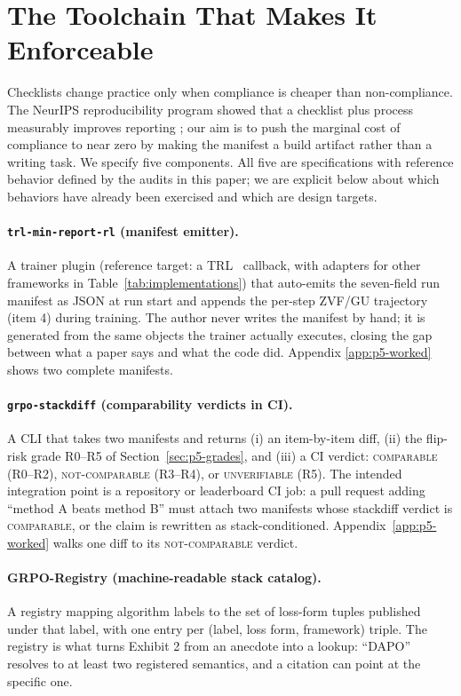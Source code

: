\documentclass{article}  \usepackage[preprint,nonatbib]{neurips_2026} \usepackage[numbers]{natbib}
\providecommand{\tableref}[1]{Table~\ref{#1}}
\providecommand{\secref}[1]{Section~\ref{#1}}
\begin{document}
 \section{The Toolchain That Makes It Enforceable}
\label{sec:p5-toolchain}
Checklists change practice only when compliance is cheaper than
non-compliance. The NeurIPS reproducibility program showed that a checklist
plus process measurably improves reporting \citep{pineau2020improving}; our
aim is to push the marginal cost of compliance to near zero by making the
manifest a build artifact rather than a writing task. We specify five
components. All five are specifications with reference behavior defined by
the audits in this paper; we are explicit below about which behaviors have
already been exercised and which are design targets.

\paragraph{\texttt{trl-min-report-rl} (manifest emitter).} A trainer plugin
(reference target: a TRL~\citep{vonwerra2022trl} callback, with adapters for
other frameworks in \tableref{tab:implementations}) that auto-emits the
seven-field run manifest as JSON at run start and appends the per-step ZVF/GU
trajectory (item 4) during training. The author never writes the manifest by
hand; it is generated from the same objects the trainer actually executes,
closing the gap between what a paper says and what the code did. Appendix
\ref{app:p5-worked} shows two complete manifests.

\paragraph{\texttt{grpo-stackdiff} (comparability verdicts in CI).} A CLI
that takes two manifests and returns (i) an item-by-item diff, (ii) the
flip-risk grade R0--R5 of \secref{sec:p5-grades}, and (iii) a CI verdict:
\textsc{comparable} (R0--R2), \textsc{not-comparable} (R3--R4), or
\textsc{unverifiable} (R5). The intended integration point is a repository or
leaderboard CI job: a pull request adding ``method A beats method B'' must
attach two manifests whose stackdiff verdict is \textsc{comparable}, or the
claim is rewritten as stack-conditioned. Appendix~\ref{app:p5-worked} walks
one diff to its \textsc{not-comparable} verdict.

\paragraph{GRPO-Registry (machine-readable stack catalog).} A registry
mapping algorithm labels to the set of loss-form tuples published under that
label, with one entry per (label, loss form, framework) triple. The registry
is what turns Exhibit 2 from an anecdote into a lookup: ``DAPO'' resolves to
at least two registered semantics, and a citation can point at the specific
one.
\end{document}
